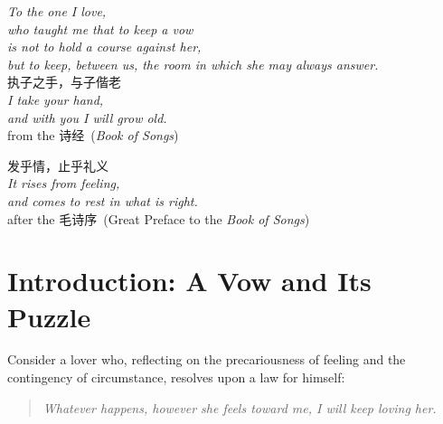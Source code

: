 \begin{abstract}
\vspace{0.6em}
\noindent\textbf{Keywords}\quad
self-legislation; autonomy; reasons-responsiveness; non-domination; recognition; ideological recognition; Hohfeldian rights; social reproduction; exploitation; relational autonomy; justice in intimate relationships.
\end{abstract}
\clearpage

\thispagestyle{empty}
\null\vfill
\begin{center}
{\itshape\color{ink}
To the one I love,\\[0.4em]
who taught me that to keep a vow\\[0.25em]
is not to hold a course against her,\\[0.25em]
but to keep, between us, the room in which she may always answer.\\}
\vspace{2.6em}
{\cjkfont\large\color{rosedeep} 执子之手，与子偕老}\\[0.8em]
{\itshape\small\color{rosedeep}
I take your hand,\\[0.18em]
and with you I will grow old.}\\[1.0em]
{\footnotesize\color{lightgold}from the \cjkfont 诗经\/{\normalfont\ (\textit{Book of Songs})}}
\vspace{2.4em}

{\cjkfont\large\color{rosedeep} 发乎情，止乎礼义}\\[0.8em]
{\itshape\small\color{rosedeep}
It rises from feeling,\\[0.18em]
and comes to rest in what is right.}\\[1.0em]
{\footnotesize\color{lightgold}after the \cjkfont 毛诗序\/{\normalfont\ (Great Preface to the \textit{Book of Songs})}}
\end{center}
\vfill\null
\clearpage

\section{Introduction: A Vow and Its Puzzle}\label{p03:sec:intro}

Consider a lover who, reflecting on the precariousness of feeling and the contingency of circumstance, resolves upon a law for himself:

\begin{quote}\itshape
Whatever happens, however she feels toward me, I will keep loving her.
\end{quote}


